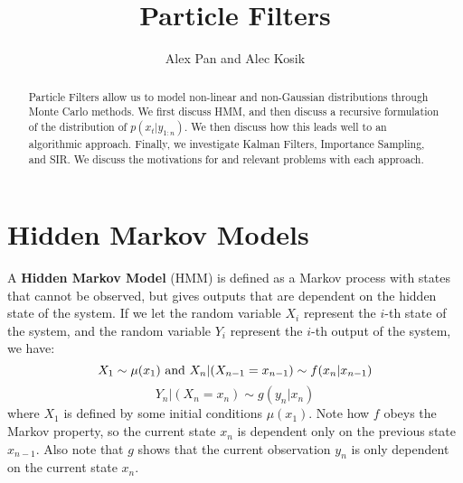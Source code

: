 \documentclass{article}
\title{\vspace{-2cm}Particle Filters} %
\author{Alex Pan and Alec Kosik}
\date{} %
\begin{document}
\maketitle

\begin{abstract}
Particle Filters allow us to model non-linear and non-Gaussian distributions through Monte Carlo methods. We first discuss HMM, and then discuss a recursive formulation of the distribution of $p(x_t|y_{1:n})$. We then discuss how this leads well to an algorithmic approach. Finally, we investigate Kalman Filters, Importance Sampling, and SIR. We discuss the motivations for and relevant problems with each approach.
\end{abstract}

\section{Hidden Markov Models}

A \textbf{Hidden Markov Model} (HMM) is defined as a Markov process with states that cannot be observed, but gives outputs that are dependent on the hidden state of the system. If we let the random variable $X_i$ represent the $i$-th state of the system, and the random variable $Y_i$ represent the $i$-th output of the system, we have:
\begin{equation}
X_1 \sim \mu (x_1) \textnormal{ and } X_n|(X_{n-1}=x_{n-1}) \sim f(x_n|x_{n-1})
\end{equation}
\begin{equation}
Y_n|(X_n = x_n) \sim g(y_n|x_n)
\end{equation}
where $X_1$ is defined by some initial conditions $\mu(x_1)$. Note how $f$ obeys the Markov property, so the current state $x_n$ is dependent only on the previous state $x_{n-1}$. Also note that $g$ shows that the current observation $y_n$ is only dependent on the current state $x_n$.
\end{document}
